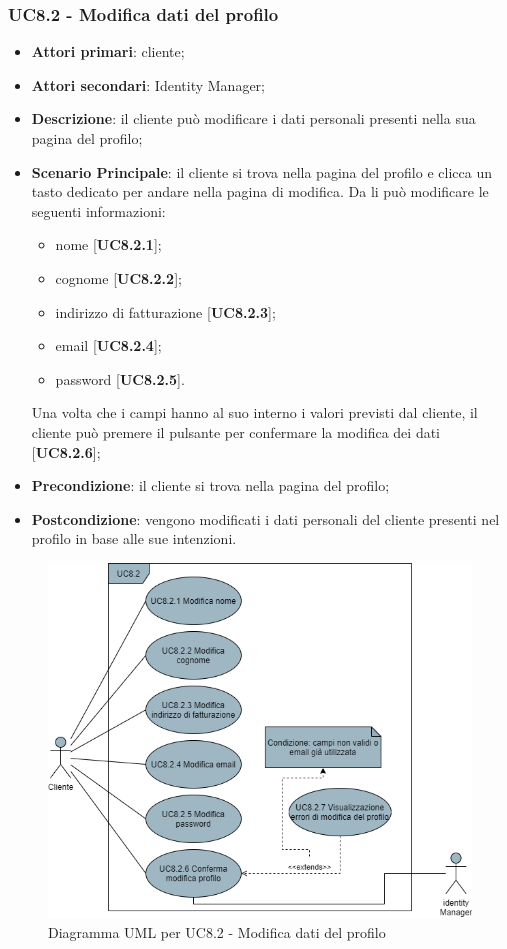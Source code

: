 \subsubsection{UC8.2 - Modifica dati del profilo}
\begin{itemize}
\item \textbf{Attori primari}: cliente;
\item \textbf{Attori secondari}: Identity Manager;
\item \textbf{Descrizione}: il cliente può modificare i dati personali presenti nella sua pagina del profilo;
\item \textbf{Scenario Principale}: il cliente si trova nella pagina del profilo e clicca un tasto dedicato per andare nella pagina di modifica. Da li può modificare le seguenti informazioni:
\begin{itemize}
\item nome [\textbf{UC8.2.1}];
\item cognome [\textbf{UC8.2.2}];
\item indirizzo di fatturazione [\textbf{UC8.2.3}];
\item email [\textbf{UC8.2.4}];
\item password [\textbf{UC8.2.5}].
\end{itemize}
Una volta che i campi hanno al suo interno i valori previsti dal cliente, il cliente può premere il pulsante per confermare la modifica dei dati [\textbf{UC8.2.6}];
\item \textbf{Precondizione}: il cliente si trova nella pagina del profilo;
\item \textbf{Postcondizione}: vengono modificati i dati personali del cliente presenti nel profilo in base alle sue intenzioni.
\end{itemize}

\begin{figure}[H]
\centering
\includegraphics[scale=0.6]{res/UseCase/Immagini/ModificaProfilo}
\caption{Diagramma UML per UC8.2 - Modifica dati del profilo}
\end{figure}


